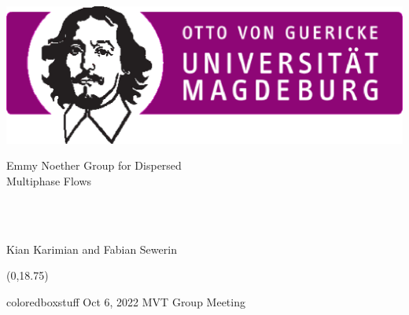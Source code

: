 \documentclass[10pt,xcolor=dvipsnames]{beamer}
\begin{document}

\begin{frame}[t]

\includegraphics[width=0.3\columnwidth]{fig/ovgu-crop_fvst.eps}\qquad
\parbox[b][1cm][t]{0.6\columnwidth}{Emmy Noether Group for Dispersed\\Multiphase Flows}\hfill\mbox{}\\
\begin{center}
 \\[0\baselineskip]
Kian Karimian and Fabian Sewerin\\[0.5\baselineskip]
\end{center}

\begin{textblock}{20}(0,18.75)
\begin{beamercolorbox}[wd=\paperwidth,sep=0.5em]{coloredboxstuff}
\small Oct 6, 2022 \hfill MVT Group Meeting \\\mbox{}
\end{beamercolorbox}
\end{textblock}

\end{frame}



\end{document}
